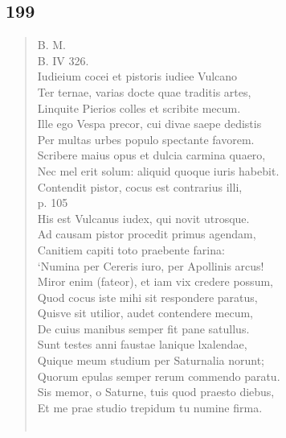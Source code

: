 \documentclass[11pt, a4paper]{report}
\begin{document}
            \subsection*{199}
      \begin{verse}
      B. M. \\ B. IV 326. \\ Iudieium cocei et pistoris iudiee Vulcano \\ Ter ternae, varias docte quae traditis artes, \\ Linquite Pierios colles et scribite mecum. \\ Ille ego Vespa precor, cui divae saepe dedistis \\ Per multas urbes populo spectante favorem. \\ Scribere maius opus et dulcia carmina quaero, \\ Nec mel erit solum: aliquid quoque iuris habebit. \\ Contendit pistor, cocus est contrarius illi, \\ p. 105 \\ His est Vulcanus iudex, qui novit utrosque. \\ Ad causam pistor procedit primus agendam, \\ Canitiem capiti toto praebente farina: \\ ‘Numina per Cereris iuro, per Apollinis arcus! \\ Miror enim (fateor), et iam vix credere possum, \\ Quod cocus iste mihi sit respondere paratus, \\ Quisve sit utilior, audet contendere mecum, \\ De cuius manibus semper fit pane satullus. \\ Sunt testes anni faustae lanique lxalendae, \\ Quique meum studium per Saturnalia norunt; \\ Quorum epulas semper rerum commendo paratu. \\ Sis memor, o Saturne, tuis quod praesto diebus, \\ Et me prae studio trepidum tu numine firma. \\ 
        ﻿\pagebreak 

\end{verse}
\end{document}
